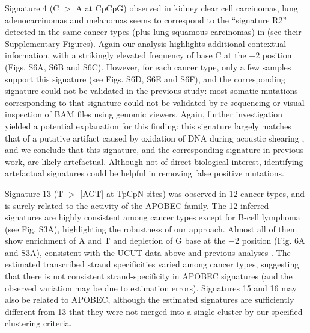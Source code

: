 \documentclass[10pt,letterpaper]{article}
\begin{document}
Signature 4 (C $>$ A at CpCpG) observed in kidney clear cell carcinomas, lung adenocarcinomas and melanomas 
seems to correspond to the ``signature R2''  detected in the same cancer types (plus lung squamous carcinomas) in 
\cite{pmid23318258} (see their Supplementary Figures).
Again our analysis highlights additional contextual information, with a strikingly elevated frequency of base C at the $-2$ position (Figs. S6A, S6B and S6C).
However, for each cancer type, only a few samples support this signature (see Figs. S6D, S6E and S6F),
and the corresponding signature 
could not be validated in the previous study: most somatic mutations corresponding to that signature could not be validated by re-sequencing or visual inspection of BAM files using genomic viewers. Again, further investigation
yielded a potential explanation for this finding:
this signature largely matches that of a putative artifact caused by oxidation of DNA during acoustic shearing \cite{pmid23303777}, 
and we conclude that this signature, and the corresponding signature in previous work, are likely artefactual.
Although not of direct biological interest,
identifying artefactual signatures could be helpful in removing false positive mutations.

Signature 13 (T $>$ [AGT] at TpCpN sites) was observed in 12 cancer types, and is surely related to the activity of the APOBEC family. The 12 inferred signatures are highly consistent among cancer types except for B-cell lymphoma (see Fig. S3A), highlighting the robustness
of our approach.  Almost all of them show enrichment of A and T and depletion of G base at the $-2$ position (Fig. 6A and S3A), 
consistent with the UCUT data above and previous analyses \cite{pmid23318258}.
The estimated transcribed strand specificities varied among cancer types, suggesting that there is not consistent strand-specificity in APOBEC signatures (and the observed variation may be due to estimation errors).
Signatures 15 and 16 may also be related to APOBEC, although the estimated signatures are sufficiently different from 13 that they
were not merged into a single 
cluster by our specified clustering criteria.
\end{document}
